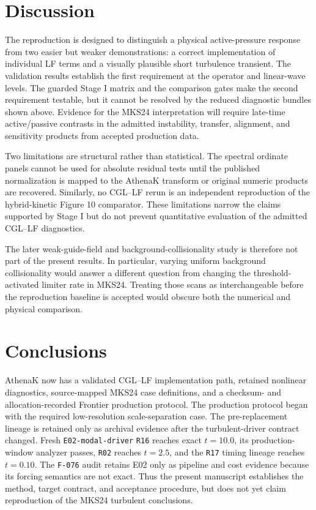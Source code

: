 \documentclass[11pt]{article}
\begin{document}
\section{Discussion}

The reproduction is designed to distinguish a physical active-pressure
response from two easier but weaker demonstrations: a correct implementation
of individual LF terms and a visually plausible short turbulence transient.
The validation results establish the first requirement at the operator and
linear-wave levels.  The guarded Stage I matrix and the comparison gates make
the second requirement testable, but it cannot be resolved by the reduced
diagnostic bundles shown above.  Evidence for the MKS24 interpretation will
require late-time active/passive contrasts in the admitted instability,
transfer, alignment, and sensitivity products from accepted production data.

Two limitations are structural rather than statistical.  The spectral
ordinate panels cannot be used for absolute residual tests until the
published normalization is mapped to the AthenaK transform or original
numeric products are recovered.  Similarly, no CGL--LF rerun is an
independent reproduction of the hybrid-kinetic Figure 10 comparator.  These
limitations narrow the claims supported by Stage I but do not prevent
quantitative evaluation of the admitted CGL--LF diagnostics.

The later weak-guide-field and background-collisionality study is therefore
not part of the present results.  In particular, varying uniform background
collisionality would answer a different question from changing the
threshold-activated limiter rate in MKS24.  Treating those scans as
interchangeable before the reproduction baseline is accepted would obscure
both the numerical and physical comparison.

\section{Conclusions}

AthenaK now has a validated CGL--LF implementation path, retained nonlinear
diagnostics, source-mapped MKS24 case definitions, and a checksum- and
allocation-recorded Frontier production protocol.  The production protocol
began with the required low-resolution scale-separation case.  The
pre-replacement lineage is retained only as archival evidence after the
turbulent-driver contract changed.  Fresh \texttt{E02-modal-driver}
\texttt{R16} reaches exact \(t=10.0\), its production-window analyzer passes,
\texttt{R02} reaches \(t=2.5\), and the \texttt{R17} timing lineage reaches
\(t=0.10\).  The \texttt{F-076} audit retains E02 only as pipeline and cost
evidence because its forcing semantics are not exact.  Thus the present
manuscript establishes the method, target contract, and acceptance procedure,
but does not yet claim reproduction of the MKS24 turbulent conclusions.
\end{document}
